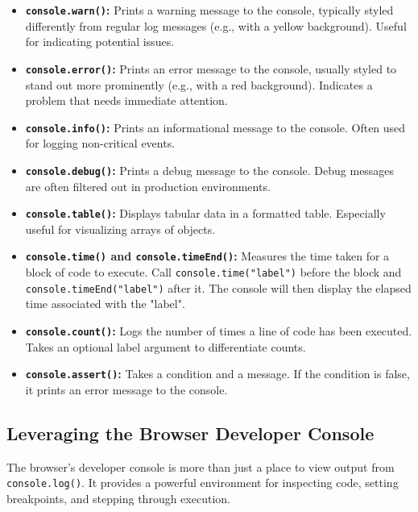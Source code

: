 \documentclass{article}
\begin{document}
{{{{\begin{itemize}
    \item \textbf{\texttt{console.warn()}:} Prints a warning message to the console, typically styled differently from regular log messages (e.g., with a yellow background). Useful for indicating potential issues.
    \item \textbf{\texttt{console.error()}:} Prints an error message to the console, usually styled to stand out more prominently (e.g., with a red background).  Indicates a problem that needs immediate attention.
    \item \textbf{\texttt{console.info()}:} Prints an informational message to the console. Often used for logging non-critical events.
    \item \textbf{\texttt{console.debug()}:} Prints a debug message to the console.  Debug messages are often filtered out in production environments.
    \item \textbf{\texttt{console.table()}:}  Displays tabular data in a formatted table.  Especially useful for visualizing arrays of objects.
    \item \textbf{\texttt{console.time()} and \texttt{console.timeEnd()}:} Measures the time taken for a block of code to execute.  Call \texttt{console.time("label")} before the block and \texttt{console.timeEnd("label")} after it.  The console will then display the elapsed time associated with the "label".
    \item \textbf{\texttt{console.count()}:} Logs the number of times a line of code has been executed. Takes an optional label argument to differentiate counts.
    \item \textbf{\texttt{console.assert()}:}  Takes a condition and a message. If the condition is false, it prints an error message to the console.
\end{itemize}

\subsection*{Leveraging the Browser Developer Console}

The browser's developer console is more than just a place to view output from \texttt{console.log()}. It provides a powerful environment for inspecting code, setting breakpoints, and stepping through execution.

}}}}
\end{document}
